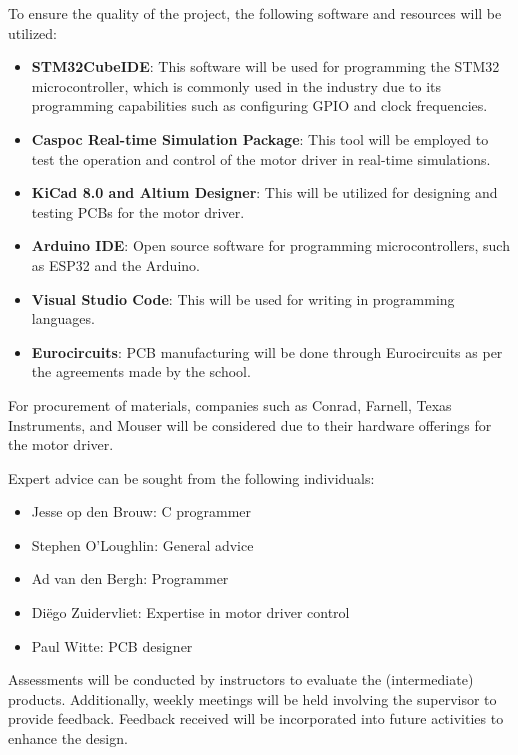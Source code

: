 To ensure the quality of the project, the following software and resources will be utilized:

\begin{itemize}
  \item \textbf{STM32CubeIDE}: This software will be used for programming the STM32 microcontroller, which is commonly used in the industry due to its programming capabilities such as configuring GPIO and clock frequencies.
  \item \textbf{Caspoc Real-time Simulation Package}: This tool will be employed to test the operation and control of the motor driver in real-time simulations.
  \item \textbf{KiCad 8.0 and Altium Designer}: This will be utilized for designing and testing PCBs for the motor driver.
   \item \textbf{Arduino IDE}: Open source software for programming microcontrollers, such as ESP32 and the Arduino.
   \item \textbf{Visual Studio Code}: This will be used for writing in programming languages.
  \item \textbf{Eurocircuits}: PCB manufacturing will be done through Eurocircuits as per the agreements made by the school.
\end{itemize}

For procurement of materials, companies such as Conrad, Farnell, Texas Instruments, and Mouser will be considered due to their hardware offerings for the motor driver.

Expert advice can be sought from the following individuals:
\begin{itemize}
  \item Jesse op den Brouw: C programmer
  \item Stephen O'Loughlin: General advice
  \item Ad van den Bergh: Programmer
  \item Diëgo Zuidervliet: Expertise in motor driver control
  \item Paul Witte: PCB designer
\end{itemize}

Assessments will be conducted by instructors to evaluate the (intermediate) products. Additionally, weekly meetings will be held involving the supervisor to provide feedback.
Feedback received will be incorporated into future activities to enhance the design. 


